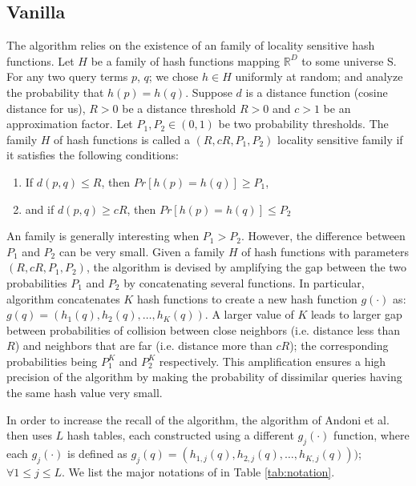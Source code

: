 \subsection{Vanilla \lsh}
\label{sec:vlsh}
The \lsh algorithm relies on the existence of an family of locality sensitive hash functions. 
Let $H$ be a family of hash functions mapping 
 $\mathbb{R}^D$ to some universe S. For any two query terms $p$, $q$; we chose $h\in H$ uniformly at random; 
 and analyze the probability that $h(p) = h(q)$.  
 Suppose $d$ is a distance function (cosine distance for us), 
$R > 0$ be a distance threshold $R>0$ and $c>1$ be an approximation factor.   
Let $P_1, P_2 \in (0, 1)$ be two probability thresholds.  
The family $H$ of hash functions is called a $(R, cR, P_1, P_2)$ locality sensitive family if 
 it satisfies the following conditions:
\begin{enumerate}
\item If $d(p,q) \leq R$, then $Pr[h(p)=h(q)] \geq P_1$, 
\item and if $d(p,q) \geq cR$, then $Pr[h(p)=h(q)] \leq P_2$
\end{enumerate}
An \lsh family is generally interesting when  $P_1>P_2$. 
However, the difference between $P_1$ and $P_2$ can be very small. 
Given a family $H$ of hash functions with parameters $(R, cR, P_1,P_2)$, 
the \lsh algorithm is devised by amplifying the gap between 
the two probabilities $P_1$ and $P_2$ by concatenating several functions. 
In particular, \lsh algorithm concatenates $K$ hash functions
to create a new hash function $g(\cdot)$ as:
$g(q)=(h_1(q),h_2(q),\dots,h_K(q))$. 
A larger value of $K$ leads to larger 
gap between probabilities of collision between close neighbors (i.e. distance less than $R$) and neighbors that are far (i.e. 
distance more than $cR$); 
the corresponding probabilities being $P_1^{K}$ and $P_2^{K}$ respectively. 
This amplification ensures a high precision of the algorithm by  
making the probability of dissimilar queries having the same hash value very small.

In order to increase the recall of the \lsh algorithm, the algorithm of Andoni et al. then uses
$L$ hash tables, each constructed using a different $g_j(\cdot)$ function, where each 
$g_j(\cdot)$ is defined as $g_j(q)=(h_{1,j}(q),h_{2,j}(q),\dots,h_{K,j}(q)))$; $\forall 1 \leq j \leq  L$. 
We list the major notations of \lsh in Table \ref{tab:notation}. 

